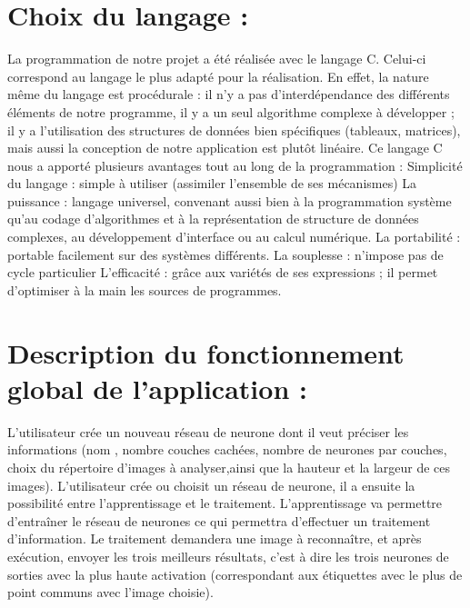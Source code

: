 \documentclass{article}
\begin{document}
\section{Choix du langage :}
La programmation de notre projet a été réalisée avec le langage C. Celui-ci correspond au langage le plus adapté pour la réalisation. En effet, la nature même du langage est procédurale : il n'y a pas d'interdépendance des différents éléments de notre programme, il y a un seul algorithme complexe à développer ; il y a l'utilisation des structures de données bien spécifiques (tableaux, matrices), mais aussi la conception de notre application est plutôt linéaire. 
Ce langage C nous a apporté plusieurs avantages tout au long de la programmation :
Simplicité du langage : simple à utiliser (assimiler l'ensemble de ses mécanismes)
La puissance : langage universel, convenant aussi bien  à la programmation système qu'au codage d'algorithmes et à la représentation de structure de données complexes, au développement d'interface ou au calcul numérique.
La portabilité : portable facilement sur des systèmes différents.
La souplesse : n'impose pas de cycle particulier
L'efficacité : grâce aux variétés de ses expressions ; il permet d'optimiser à la main les sources de programmes.

\section{Description du fonctionnement global de l'application :}
L'utilisateur crée un nouveau réseau de neurone dont il veut préciser les informations (nom , nombre couches cachées, nombre de neurones par couches, choix du répertoire d'images à analyser,ainsi que la hauteur et la largeur de ces images).
L'utilisateur crée ou choisit un réseau de neurone, il a ensuite la possibilité entre l'apprentissage et le traitement.
L'apprentissage va permettre d'entraîner le réseau de neurones ce qui permettra d'effectuer un traitement d'information.
Le traitement demandera une image à reconnaître, et après exécution, envoyer les trois meilleurs résultats, c'est à dire les trois neurones de sorties avec la plus haute activation (correspondant aux étiquettes avec le plus de point communs avec l'image choisie). 
\end{document}

